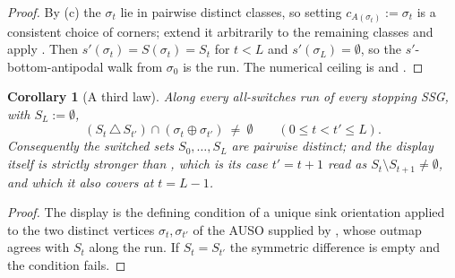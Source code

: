 \documentclass[11pt]{article}
\theoremstyle{plain}
\newtheorem{corollary}[theorem]{Corollary}
\theoremstyle{definition}
\begin{document}
\begin{proof}
By (c) the $\sigma_t$ lie in pairwise distinct classes,
so setting $c_{A(\sigma_t)}:=\sigma_t$ is a consistent choice of corners;
extend it arbitrarily to the remaining classes and apply
. Then $s'(\sigma_t)=S(\sigma_t)=S_t$ for $t<L$ and
$s'(\sigma_L)=\emptyset$, so the $s'$-bottom-antipodal walk from $\sigma_0$ is
the run. The numerical ceiling is  and
.
\end{proof}

\begin{corollary}[A third law]\label{cor:law-u}
Along every all-switches run of every stopping SSG, with $S_L:=\emptyset$,
\[
  (S_t\,\triangle\,S_{t'})\cap(\sigma_t\oplus\sigma_{t'})\ \ne\ \emptyset
  \qquad(0\le t<t'\le L).
\]
Consequently the switched sets $S_0,\dots,S_L$ are pairwise distinct; and
the display itself is strictly stronger than , which
is its case $t'=t+1$ read as $S_t\setminus S_{t+1}\ne\emptyset$, and which
it also covers at $t=L-1$.
\end{corollary}

\begin{proof}
The display is the defining condition of a unique sink orientation applied to
the two distinct vertices $\sigma_t,\sigma_{t'}$ of the AUSO supplied by
, whose outmap agrees with $S_t$ along the run. If
$S_t=S_{t'}$ the symmetric difference is empty and the condition fails.
\end{proof}
\end{document}
